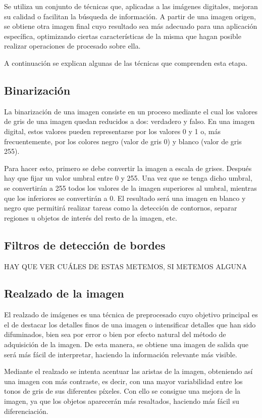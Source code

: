 Se utiliza un conjunto de técnicas que, aplicadas a las imágenes digitales, mejoran su calidad o facilitan la búsqueda de información. A partir de una imagen origen, se obtiene otra imagen final cuyo resultado sea más adecuado para una aplicación específica, optimizando ciertas características de la misma que hagan posible realizar operaciones de procesado sobre ella.

A continuación se explican algunas de las técnicas que comprenden esta etapa.


\subsection{Binarización}
La binarización de una imagen consiste en un proceso mediante el cual los valores de gris de una imagen quedan reducidos a dos: verdadero y falso. En una imagen digital, estos valores pueden representarse por los valores 0 y 1 o, más frecuentemente, por los colores negro (valor de gris 0) y blanco (valor de gris 255).

Para hacer esto, primero se debe convertir la imagen a escala de grises. Después hay que fijar
un valor umbral entre 0 y 255. Una vez que se tenga dicho umbral, se convertirán a 255 todos
los valores de la imagen superiores al umbral, mientras que los inferiores se convertirán a 0. El resultado será una imagen en blanco y negro que permitirá realizar tareas como la detección de contornos, separar regiones u objetos de interés del resto de la imagen, etc.

\subsection{Filtros de detección de bordes}
HAY QUE VER CUÁLES DE ESTAS METEMOS, SI METEMOS ALGUNA

\subsection{Realzado de la imagen}
El realzado de imágenes es una técnica de preprocesado cuyo objetivo principal es el de destacar los detalles finos de una imagen o intensificar detalles que han sido difuminados, bien sea por error o bien por efecto natural del método de adquisición de la imagen. De esta manera, se obtiene una imagen de salida que será más fácil de interpretar, haciendo la información relevante más visible.

Mediante el realzado se intenta acentuar las aristas de la imagen, obteniendo así una imagen con más contraste, es decir, con una mayor variabilidad entre los tonos de gris de sus diferentes píxeles. Con ello se consigue una mejora de la imagen, ya que los objetos aparecerán más resaltados, haciendo más fácil su diferenciación.


